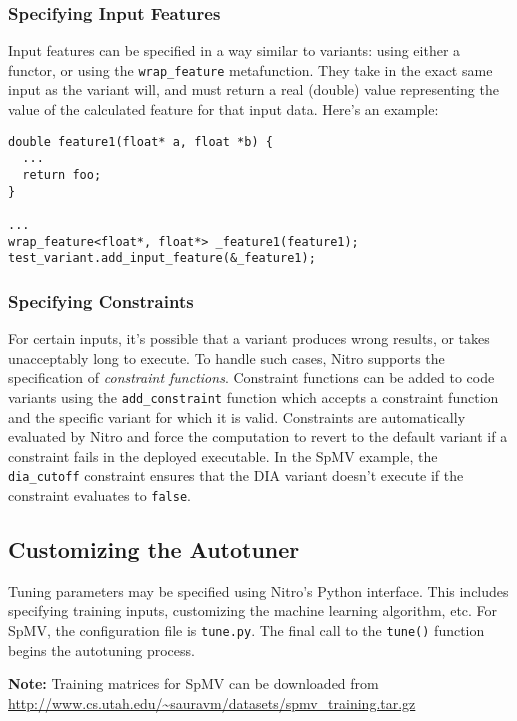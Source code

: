 \documentclass[12pt]{article}
\begin{document}
\subsubsection{Specifying Input Features}
Input features can be specified in a way similar to variants: using either a functor, or
using the \texttt{wrap\_feature} metafunction. They take in the exact same input as the
variant will, and must return a real (double) value representing the value of the calculated
feature for that input data. Here's an example:

\begin{verbatim}
double feature1(float* a, float *b) {
  ...
  return foo;
}

...
wrap_feature<float*, float*> _feature1(feature1);
test_variant.add_input_feature(&_feature1);
\end{verbatim}

\subsubsection{Specifying Constraints}

For certain inputs, it's possible that a variant produces wrong results, or takes
unacceptably long to execute. To handle such cases, Nitro supports the specification
of \emph{constraint functions}.
Constraint functions can be added to code variants using the
\texttt{add\_constraint} function which accepts a constraint function and the specific variant for which it is valid.
Constraints are automatically evaluated by Nitro and force the computation to revert to
the default variant if a constraint fails in the deployed executable.
In the SpMV example, the \texttt{dia\_cutoff} constraint ensures that
the DIA variant doesn't execute if the constraint evaluates to \texttt{false}.

\subsection{Customizing the Autotuner}
\label{sec:tunepy}

Tuning parameters may be specified using Nitro's Python interface. This includes
specifying training inputs, customizing the machine learning algorithm, etc.
For SpMV, the configuration file is \texttt{tune.py}. The final call to
the \texttt{tune()} function begins the autotuning process.

\textbf{Note:} Training matrices for SpMV can be downloaded from \url{http://www.cs.utah.edu/~sauravm/datasets/spmv\_training.tar.gz}
\end{document}
